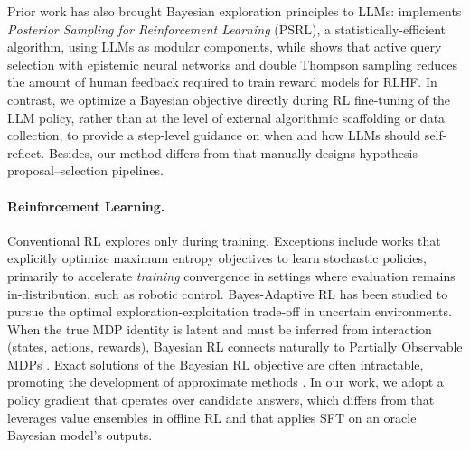 Prior work has also brought Bayesian exploration principles to LLMs: \cite{arumugam2025toward} implements \emph{Posterior Sampling for Reinforcement Learning} (PSRL), a statistically-efficient algorithm, using LLMs as modular components, while \cite{dwaracherla2024efficient} shows that active query selection with epistemic neural networks and double Thompson sampling reduces the amount of human feedback required to train reward models for RLHF. 
In contrast, we optimize a Bayesian objective directly during RL fine-tuning of the LLM policy, rather than at the level of external algorithmic scaffolding or data collection, to provide a step-level guidance on when and how LLMs should self-reflect.
Besides, our method differs from \cite{wang2023hypothesis,qiu2023phenomenal} that manually designs hypothesis proposal–selection pipelines.

\vspace{-0.15cm}
\paragraph{Reinforcement Learning.} Conventional RL explores only during training. Exceptions include works that explicitly optimize maximum entropy objectives \citep{haarnoja2018soft} to learn stochastic policies, primarily to accelerate \textit{training} convergence in settings where evaluation remains in-distribution, such as robotic control. Bayes-Adaptive RL \citep{bellman1959adaptive,duff2002optimal,guez2012efficient,ghavamzadeh2015bayesian,lidayan2025bamdp,liu2023reason} has been studied to pursue the optimal exploration-exploitation trade-off in uncertain environments.
When the true MDP identity is latent and must be inferred from interaction (states, actions, rewards), Bayesian RL connects naturally to Partially Observable MDPs \citep{duff2001monte,ghosh2021generalization}. Exact solutions of the Bayesian RL objective are often intractable, promoting the development of approximate methods \citep{guez2012efficient,arumugam2022planning,chen2024bayes,arumugam2024satisficing}. In our work, we adopt a policy gradient that operates over candidate answers, which differs from \cite{ghosh2022offline} that leverages value ensembles in offline RL and \cite{qiu2025bayesian} that applies SFT on an oracle Bayesian model's outputs. 
